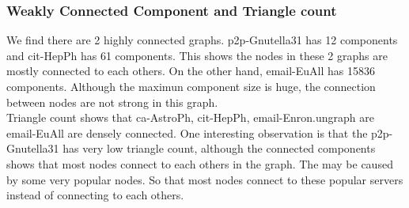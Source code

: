 \subsubsection{Weakly Connected Component and Triangle count}

We find there are 2 highly connected graphs. p2p-Gnutella31 has 12 components and cit-HepPh has 61 components. This shows the nodes in these 2 graphs are mostly connected to each others.
On the other hand, email-EuAll has 15836 components. Although the maximun component size is huge, the connection between nodes are not strong in this graph.
\\
Triangle count shows that ca-AstroPh, cit-HepPh, email-Enron.ungraph are email-EuAll are densely connected. One interesting observation is that the p2p-Gnutella31 has very low triangle count, although the connected components shows that most nodes connect to each others in the graph. The may be caused by some very popular nodes. So that most nodes connect to these popular servers instead of connecting to each others.
\\
\\
\\
\\
\\
\

